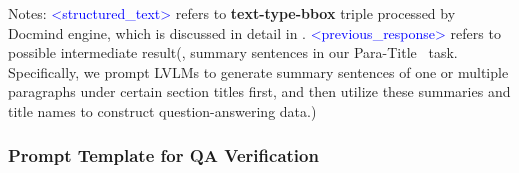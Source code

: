 Notes: \textcolor{blue}{<structured\_text>} refers to \textbf{text-type-bbox} triple processed by Docmind engine, which is discussed in detail in . \textcolor{blue}{<previous\_response>} refers to possible intermediate result(\eg, summary sentences in our Para-Title \Locating~task. Specifically, we prompt LVLMs to generate summary sentences of one or multiple paragraphs under certain section titles first, and then utilize these summaries and title names to construct question-answering data.)



\subsubsection{Prompt Template for QA Verification}

